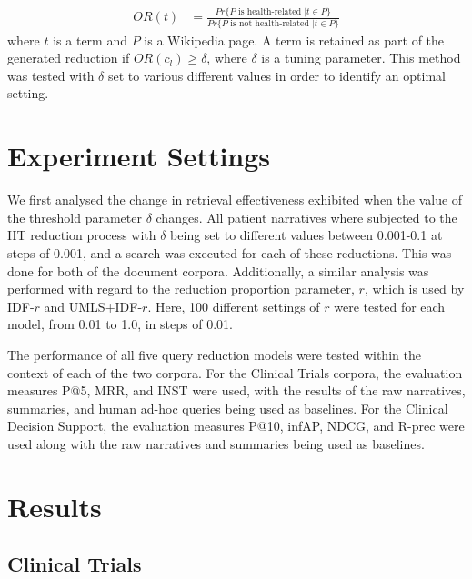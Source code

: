 \documentclass[a4paper]{report}
\begin{document}
\begin{equation}
\label{hrterms}
\begin{split}
OR(t) &= \frac{Pr\{ P \text{ is health-related } | t \in P\}}{Pr\{ P \text{ is not health-related } | t \in P\}}
\end{split}
\end{equation}
where $t$ is a term and $P$ is a Wikipedia page. A term is retained as part of the generated reduction if $OR(c_l) \geq \delta$, where $\delta$ is a tuning parameter. This method was tested with $\delta$ set to various different values in order to identify an optimal setting. 

\section{Experiment Settings}
We first analysed the change in retrieval effectiveness exhibited when the value of the threshold parameter $\delta$ changes. All patient narratives where subjected to the HT reduction process with $\delta$ being set to different values between 0.001-0.1 at steps of 0.001, and a search was executed for each of these reductions. This was done for both of the document corpora. Additionally, a similar analysis was performed with regard to the reduction proportion parameter, $r$, which is used by IDF-$r$ and UMLS+IDF-$r$. Here, 100 different settings of $r$ were tested for each model, from 0.01 to 1.0, in steps of 0.01.

The performance of all five query reduction models were tested within the context of each of the two corpora. For the Clinical Trials corpora, the evaluation measures P@5, MRR, and INST were used, with the results of the raw narratives, summaries, and human ad-hoc queries being used as baselines. For the Clinical Decision Support, the evaluation measures P@10, infAP, NDCG, and R-prec were used along with the raw narratives and summaries being used as baselines. 

\section{Results}

\subsection{Clinical Trials}
\end{document}
